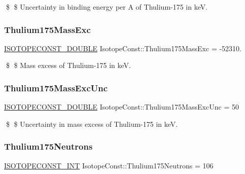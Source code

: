 \$ \$ Uncertainty in binding energy per A of Thulium-\/175 in keV. \mbox{\label{group___isotope_const-_thulium-_tm175_ga09a14b1d9cf548f8ba5376cf473fa841}} 
\subsubsection{\texorpdfstring{Thulium175\+Mass\+Exc}{Thulium175MassExc}}
{\footnotesize\ttfamily \mbox{\hyperlink{group___isotope_const-_macros_ga8f45a7272ce02c0b4c65c44636ed719a}{I\+S\+O\+T\+O\+P\+E\+C\+O\+N\+S\+T\+\_\+\+D\+O\+U\+B\+LE}} Isotope\+Const\+::\+Thulium175\+Mass\+Exc = -\/52310.}

\$ \$ Mass excess of Thulium-\/175 in keV. \mbox{\label{group___isotope_const-_thulium-_tm175_ga45953453658514aee8eabca8441cbd9f}} 
\subsubsection{\texorpdfstring{Thulium175\+Mass\+Exc\+Unc}{Thulium175MassExcUnc}}
{\footnotesize\ttfamily \mbox{\hyperlink{group___isotope_const-_macros_ga8f45a7272ce02c0b4c65c44636ed719a}{I\+S\+O\+T\+O\+P\+E\+C\+O\+N\+S\+T\+\_\+\+D\+O\+U\+B\+LE}} Isotope\+Const\+::\+Thulium175\+Mass\+Exc\+Unc = 50}

\$ \$ Uncertainty in mass excess of Thulium-\/175 in keV. \mbox{\label{group___isotope_const-_thulium-_tm175_gaf488016eaa5fd7d141d4605b6cfa3c64}} 
\subsubsection{\texorpdfstring{Thulium175\+Neutrons}{Thulium175Neutrons}}
{\footnotesize\ttfamily \mbox{\hyperlink{group___isotope_const-_macros_ga5f18360b3e99483a35c32d789e62621c}{I\+S\+O\+T\+O\+P\+E\+C\+O\+N\+S\+T\+\_\+\+I\+NT}} Isotope\+Const\+::\+Thulium175\+Neutrons = 106}

